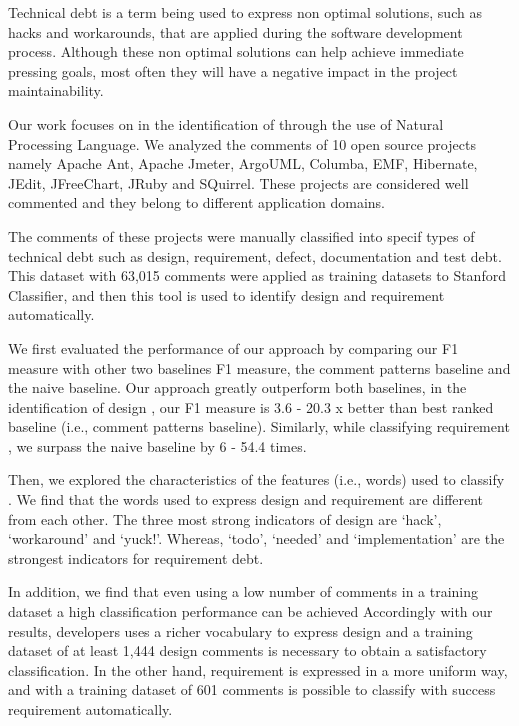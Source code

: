 Technical debt is a term being used to express non optimal solutions, such as hacks and workarounds, that are applied during the software development process. Although these non optimal solutions can help achieve immediate pressing goals, most often they will have a negative impact in the project maintainability. 

Our work focuses on in the identification of \SATD through the use of Natural Processing Language. We analyzed the comments of 10 open source projects namely Apache Ant, Apache Jmeter, ArgoUML, Columba, EMF, Hibernate, JEdit, JFreeChart, JRuby and SQuirrel. These projects are considered well commented and they belong to different application domains.

The comments of these projects were manually classified into specif types of technical debt such as design, requirement, defect, documentation and test debt. This dataset with 63,015 comments were applied as training datasets to Stanford Classifier, and then this tool is used to identify  design and requirement \SATD automatically.

We first evaluated the performance of our approach by comparing our F1 measure with other two baselines F1 measure, the comment patterns baseline and the naive baseline. Our approach greatly outperform both baselines, in the identification of design \SATD, our F1 measure is 3.6 - 20.3 x better than best ranked baseline (i.e., comment patterns baseline). Similarly, while classifying requirement \SATD, we surpass the naive baseline by 6 - 54.4 times.

Then, we explored the characteristics of the features (i.e., words) used to classify \SATD. We find that the words used to express design and requirement \SATD are different from each other. The three most strong indicators of design \SATD are `hack', `workaround' and `yuck!'. Whereas, `todo', `needed' and `implementation' are the strongest indicators for requirement debt.
 
In addition, we find that even using a low number of \SATD comments in a training dataset a high classification performance can be achieved Accordingly with our results, developers uses a richer vocabulary to express design \SATD and a training dataset of at least 1,444 design \SATD comments is necessary to obtain a satisfactory classification. In the other hand, requirement \SATD is expressed in a more uniform way, and with a training dataset of 601 \SATD comments is possible to classify with success requirement \SATD automatically.

